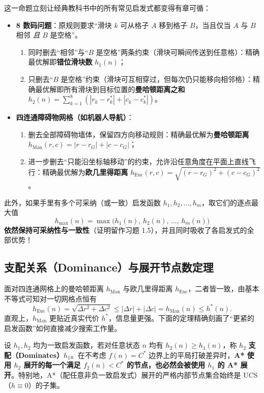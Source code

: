 这一命题立刻让经典教科书中的所有常见启发式都变得有章可循：
\begin{itemize}
  \item \textbf{8 数码问题}：原规则要求“滑块 $k$ 可从格子 $A$ 移到格子 $B$，当且仅当 $A$ 与 $B$ 相邻 \emph{且} $B$ 是空格”。
  \begin{enumerate}
    \item 同时删去“相邻”与“$B$ 是空格”两条约束（滑块可瞬间传送到任意格）：精确最优解即\textbf{错位滑块数} $h_1(n)$；
    \item 只删去“$B$ 是空格”约束（滑块可互相穿过，但每次仍只能移向相邻格）：精确最优解即所有滑块到目标位置的\textbf{曼哈顿距离之和} $h_2(n) = \sum_{k=1}^{8} (|r_k - r_k^*| + |c_k - c_k^*|)$。
  \end{enumerate}
  \item \textbf{四连通障碍物网格（如机器人导航）}：
  \begin{enumerate}
    \item 删去全部障碍物墙体，保留四方向移动规则：精确最优解为\textbf{曼哈顿距离} $h_{\text{Man}}(r,c) = |r-r_G| + |c-c_G|$；
    \item 进一步删去“只能沿坐标轴移动”的约束，允许沿任意角度在平面上直线飞行：精确最优解为\textbf{欧几里得距离} $h_{\text{Euc}}(r,c) = \sqrt{(r-r_G)^2 + (c-c_G)^2}$。
  \end{enumerate}
\end{itemize}
此外，如果手里有多个可采纳（或一致）启发函数 $h_1, h_2, \dots, h_m$，取它们的逐点最大值
\begin{equation}\label{eq:max-heuristic}
  h_{\max}(n) = \max\bigl(h_1(n),\, h_2(n),\, \dots,\, h_m(n)\bigr)
\end{equation}
\textbf{依然保持可采纳性与一致性}（证明留作习题 1.5），并且同时吸收了各启发式的全部优势！

\subsection{支配关系（Dominance）与展开节点数定理}

面对四连通网格上的曼哈顿距离 $h_{\text{Man}}$ 与欧几里得距离 $h_{\text{Euc}}$，二者皆一致，由基本不等式可知对一切网格点恒有
\[
  h_{\text{Euc}}(n) = \sqrt{\Delta r^2 + \Delta c^2} \le |\Delta r| + |\Delta c| = h_{\text{Man}}(n) \le h^*(n).
\]
直观上，$h_{\text{Man}}$ 更贴近真实代价 $h^*$，信息量更强。下面的定理精确刻画了“更紧的启发函数”如何直接减少搜索工作量。

\begin{thmBox}
\begin{theorem}\label{thm:dominance}
设 $h_1, h_2$ 均为一致启发函数，若对任意状态 $n$ 均有 $h_2(n) \ge h_1(n)$，称 $h_2$ \textbf{支配（Dominates）}$h_1$。在不考虑 $f(n)=C^*$ 边界上的平局打破差异时，\textbf{A* 使用 $h_2$ 展开的每一个满足 $f_2(n) < C^*$ 的节点，也必然会被使用 $h_1$ 的 A* 展开}。特别地，A*（配任意非负一致启发式）展开的严格内部节点集合始终是 UCS（$h\equiv 0$）的子集。
\end{theorem}
\end{thmBox}

